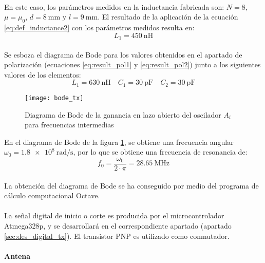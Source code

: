 \paragraph{}
En este caso, los par\'ametros medidos en la inductancia fabricada son: $N = 8$, $\mu = \mu_0$, $d = \SI{8}{\milli\metre}$ y $l = \SI{9}{\milli\metre}$. El resultado de la aplicaci\'on de la ecuaci\'on \ref{eq:def_inductance2} con los par\'ametros medidos resulta en: $$L_1 = \SI{450}{\nano\henry}$$

\paragraph{}
Se esboza el diagrama de Bode para los valores obtenidos en el apartado de polarizaci\'on (ecuaciones \ref{eq:result_pol1} y \ref{eq:result_pol2}) junto a los siguientes valores de los elementos: 
$$ L_1 = \SI{630}{\nano\henry} \quad C_1=\SI{30}{\pico\farad} \quad C_2=\SI{30}{\pico\farad} $$
\begin{figure}[h]
    \centering
    \texttt{[image: bode\_tx]}
    \caption{Diagrama de Bode de la ganancia en lazo abierto del oscilador $A_l$ para frecuencias intermedias}
    \label{fig:bode_tx}
\end{figure}
En el diagrama de Bode de la figura \ref{fig:bode_tx}, se obtiene una frecuencia angular $\omega_0 = \SI{1.8e8}{\radian\per\second}$, por lo que se obtiene una frecuencia de resonancia de:
\begin{equation}
   f_0 = \frac{\omega_0}{2\cdot\pi} = \SI{28.65}{\mega\hertz}
\end{equation}
\paragraph{}
La obtenci\'on del diagrama de Bode se ha conseguido por medio del programa de c\'alculo computacional Octave. 

\paragraph{} 
La señal digital de inicio o corte es producida por el microcontrolador Atmega328p, y se desarrollará en el correspondiente apartado (apartado \ref{sec:des_digital_tx}). El transistor PNP es utilizado como conmutador.

\paragraph{Antena} 
